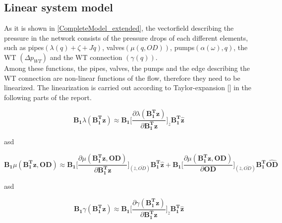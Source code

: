 %
%
%
%

\subsection{Linear system model}
 \label{SystemLin}
 
As it is shown in \eqref{CompleteModel_extended}, the vectorfield describing the pressure in the network consists of the pressure drops of each different elements, such as pipes$(\lambda(q) + \zeta + J \dot{q})$, valves$(\mu(q,OD))$, pumps$(\alpha(\omega), q)$, the WT $(\Delta p_{WT})$ and the WT connection $(\gamma(q))$.
\\
Among these functions, the pipes, valves, the pumps and the edge describing the WT connection are non-linear functions of the flow, therefore they need to be linearized. The linearization is carried out according to Taylor-expansion [] in the following parts of the report. 

\begin{equation}
  \pmb{B_1} \lambda(\pmb{{B_1^{T}}}\pmb{z}) \approx \pmb{B_1} \bigg[ \frac{\partial{\lambda(\pmb{{B_1^{T}}}\pmb{z})}}{{\partial{\pmb{{B_1^{T}}}\pmb{z}}}}   \bigg]_{\bar{z}} \pmb{{B_1^{T}}}\pmb{\hat{z}}
\label{lambda_lin}
\end{equation}

asd

\begin{equation}
  \pmb{B_1} \mu(\pmb{{B_1^{T}}}\pmb{z}, \pmb{OD}) \approx 
  \pmb{B_1} \bigg[ \frac{\partial{\mu(\pmb{{B_1^{T}}}\pmb{z}, \pmb{OD})}}{{\partial{\pmb{{B_1^{T}}}\pmb{z}}}}  \bigg]_{(\bar{z}, \bar{OD})} \pmb{{B_1^{T}}} \pmb{\hat{z}}
 +  \pmb{B_1} \bigg[ \frac{\partial{\mu(\pmb{{B_1^{T}}}\pmb{z}, \pmb{OD})}}{{\partial{\pmb{OD}}}}  \bigg]_{(\bar{z}, \bar{OD})} \pmb{{B_1^{T}}} \pmb{\hat{OD}}
\label{mu_lin}
\end{equation}

asd

\begin{equation}
  \pmb{B_1} \gamma(\pmb{{B_1^{T}}}\pmb{z}) \approx \pmb{B_1} \bigg[ \frac{\partial{\gamma(\pmb{{B_1^{T}}}\pmb{z})}}{{\partial{\pmb{{B_1^{T}}}\pmb{z}}}}   \bigg]_{\bar{z}} \pmb{{B_1^{T}}}\pmb{\hat{z}}
\label{gamma_lin}
\end{equation}


